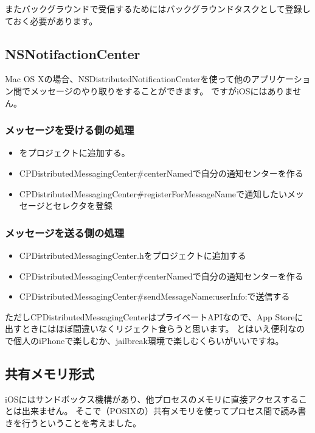 またバックグラウンドで受信するためにはバックグラウンドタスクとして登録しておく必要があります。

\subsection{NSNotifactionCenter}
Mac OS Xの場合、NSDistributedNotificationCenterを使って他のアプリケーション間でメッセージのやり取りをすることができます。
ですがiOSにはありません。
\subsubsection{メッセージを受ける側の処理}
\begin{itemize}
  \item {}をプロジェクトに追加する。
  \item CPDistributedMessagingCenter\#centerNamedで自分の通知センターを作る
  \item CPDistributedMessagingCenter\#registerForMessageNameで通知したいメッセージとセレクタを登録
\end{itemize}

\subsubsection{メッセージを送る側の処理}
\begin{itemize}
  \item CPDistributedMessagingCenter.hをプロジェクトに追加する
  \item CPDistributedMessagingCenter\#centerNamedで自分の通知センターを作る
  \item CPDistributedMessagingCenter\#sendMessageName:userInfo:で送信する
\end{itemize}

ただしCPDistributedMessagingCenterはプライベートAPIなので、App Storeに出すときにはほぼ間違いなくリジェクト食らうと思います。
とはいえ便利なので個人のiPhoneで楽しむか、jailbreak環境で楽しむくらいがいいですね。

\subsection{共有メモリ形式}
iOSにはサンドボックス機構があり、他プロセスのメモリに直接アクセスすることは出来ません。
そこで（POSIXの）共有メモリを使ってプロセス間で読み書きを行うということを考えました。

